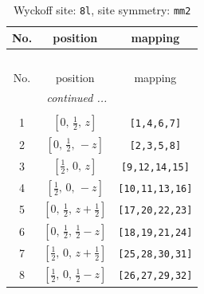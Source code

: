 \documentclass[fleqn,8pt]{jsarticle}
\begin{document}
\begin{longtable}{ccc}
\caption{Wyckoff site: {\tt 8l}, site symmetry: {\tt mm2}}
 \\
 \hline \hline
No. & position & mapping \\ \hline \endfirsthead

\multicolumn{2}{l}{\tablename\ \thetable{}} \\
 \hline \hline
No. & position & mapping \\ \hline \endhead

 \hline \hline
\multicolumn{2}{r}{\footnotesize\it continued ...} \\ \endfoot

 \hline \hline
\multicolumn{2}{r}{} \\ \endlastfoot

1 & $\left[ 0,\, \frac{1}{2},\, z \right]$ & {\tt [1,4,6,7]} \\ \hline
2 & $\left[ 0,\, \frac{1}{2},\, - z \right]$ & {\tt [2,3,5,8]} \\ \hline
3 & $\left[ \frac{1}{2},\, 0,\, z \right]$ & {\tt [9,12,14,15]} \\ \hline
4 & $\left[ \frac{1}{2},\, 0,\, - z \right]$ & {\tt [10,11,13,16]} \\ \hline
5 & $\left[ 0,\, \frac{1}{2},\, z + \frac{1}{2} \right]$ & {\tt [17,20,22,23]} \\ \hline
6 & $\left[ 0,\, \frac{1}{2},\, \frac{1}{2} - z \right]$ & {\tt [18,19,21,24]} \\ \hline
7 & $\left[ \frac{1}{2},\, 0,\, z + \frac{1}{2} \right]$ & {\tt [25,28,30,31]} \\ \hline
8 & $\left[ \frac{1}{2},\, 0,\, \frac{1}{2} - z \right]$ & {\tt [26,27,29,32]} \\
\end{longtable}
\renewcommand{\arraystretch}{1.2}
\end{document}
